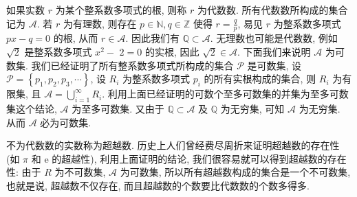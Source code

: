\documentclass[openany]{ctexbook}
\theoremstyle{kaiti}
\theoremstyle{normal}
\begin{document}
如果实数 $r$ 为某个整系数多项式的根, 则称 $r$ 为代数数. 所有代数数所构成的集合记为 $\mathcal{A}$. 若 $r$ 为有理数, 则存在 $p \in \mathbb{N}, q \in \mathbb{Z}$ 使得 $r=\frac{q}{p}$, 易见 $r$ 为整系数多项式 $p x-q=0$ 的根, 从而 $r \in \mathcal{A}$. 因此我们有 $\mathbb{Q} \subset \mathcal{A}$. 无理数也可能是代数数, 例如 $\sqrt{2}$ 是整系数多项式 $x^2-$ $2=0$ 的实根, 因此 $\sqrt{2} \in \mathcal{A}$. 下面我们来说明 $\mathcal{A}$ 为可数集. 我们已经证明了所有整系数多项式所构成的集合 $\mathcal{P}$ 是可数集, 设 $\mathcal{P}=\left\{p_1, p_2, p_3, \cdots\right\}$, 设 $R_{i}$ 为整系数多项式 $p_{i}$ 的所有实根构成的集合, 则 $R_{i}$ 为有限集, 且 $\mathcal{A}=\bigcup_{i=1}^{\infty} R_{i}$. 利用上面已经证明的可数个至多可数集的并集为至多可数集这个结论, $\mathcal{A}$ 为至多可数集. 又由于 $\mathbb{Q} \subset \mathcal{A}$ 及 $\mathbb{Q}$ 为无穷集, 可知 $\mathcal{A}$ 为无穷集. 从而 $\mathcal{A}$ 必为可数集.

不为代数数的实数称为超越数. 历史上人们曾经费尽周折来证明超越数的存在性 (如 $\pi$ 和 $\mathrm{e}$ 的超越性), 利用上面证明的结论, 我们很容易就可以得到超越数的存在性: 由于 $R$ 为不可数集, $\mathcal{A}$ 为可数集, 所以所有超越数构成的集合是一个不可数集, 也就是说, 超越数不仅存在, 而且超越数的个数要比代数数的个数多得多.
\end{document}
